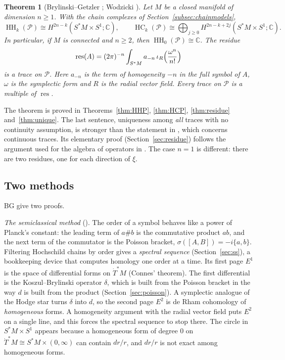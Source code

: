 \documentclass[11pt,oneside,reqno]{article}
\DeclareMathOperator{\HH}{HH}
\DeclareMathOperator{\HC}{HC}
\DeclareMathOperator{\res}{res}
\newcommand{\C}{\mathbb C}
\newcommand{\cP}{\mathcal P}
\newcommand{\Tdot}{\dot T^*}
\theoremstyle{plain}
\newtheorem{theorem}{Theorem}[section]
\theoremstyle{definition}
\theoremstyle{remark}
\begin{document}
\begin{theorem}[Brylinski--Getzler {\cite[\S4]{BG}}; Wodzicki \cite{Wodzicki-cyclic}]
\label{thm:main}
Let \(M\) be a closed manifold of dimension \(n\ge1\). With the chain
complexes of Section~\ref{subsec:chainmodels},
\[
 \HH_k(\cP)\cong H^{2n-k}(S^*M\times S^1;\C),\qquad
 \HC_k(\cP)\cong\bigoplus_{j\ge0}H^{2n-k+2j}(S^*M\times S^1;\C).
\]
In particular, if \(M\) is connected and \(n\ge2\), then \(\HH_0(\cP)\cong
\C\). The \emph{residue}
\[
 \res(A)=(2\pi)^{-n}\int_{S^*M}a_{-n}\,\iota_R\Bigl(\frac{\omega^n}{n!}\Bigr)
\]
is a trace on \(\cP\). Here \(a_{-n}\) is the term of homogeneity \(-n\) in
the full symbol of \(A\), \(\omega\) is the symplectic form and \(R\) is the
radial vector field. Every trace on \(\cP\) is a multiple of \(\res\).
\end{theorem}

The theorem is proved in Theorems~\ref{thm:HHP}, \ref{thm:HCP},
\ref{thm:residue} and~\ref{thm:unique}. The last sentence, uniqueness
among \emph{all} traces with no continuity assumption, is stronger than
the statement in \cite{BG}, which concerns continuous traces. Its
elementary proof (Section~\ref{sec:residue}) follows the argument used for
the algebra of operators in \cite{MN}. The case \(n=1\) is different: there
are two residues, one for each direction of \(\xi\).

\subsection{Two methods}\label{subsec:methods}
BG give two proofs.

\emph{The semiclassical method} (\cite[\S\S1--4]{BG}). The order of a
symbol behaves like a power of Planck's constant: the leading term of
\(a\#b\) is the commutative product \(ab\), and the next term of the
commutator is the Poisson bracket, \(\sigma([A,B])=-i\{a,b\}\). Filtering
Hochschild chains by order gives a \emph{spectral sequence}
(Section~\ref{sec:ss}), a bookkeeping device that computes homology one
order at a time. Its first page \(E^1\) is the space of differential forms
on \(\Tdot M\) (Connes' theorem). The first differential is the
Koszul--Brylinski operator \(\delta\), which is built from the Poisson
bracket in the way \(d\) is built from the product
(Section~\ref{sec:poisson}). A symplectic analogue of the Hodge star turns
\(\delta\) into \(d\), so the second page \(E^2\) is de Rham cohomology of
\emph{homogeneous} forms. A homogeneity argument with the radial vector
field puts \(E^2\) on a single line, and this forces the spectral sequence
to stop there. The circle in \(S^*M\times S^1\) appears because a
homogeneous form of degree \(0\) on \(\Tdot M\cong S^*M\times(0,\infty)\)
can contain \(dr/r\), and \(dr/r\) is not exact among homogeneous forms.
\end{document}

